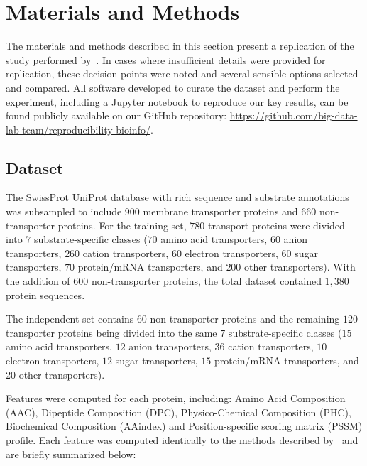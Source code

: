 \section{Materials and Methods}
\label{sec:materials}
The materials and methods described in this section present a replication of the study performed
by~\cite{mishra2014prediction}. In cases where insufficient details were provided for replication,
these decision points were noted and several sensible options selected and compared. All software 
developed to curate the dataset and perform the experiment, including a Jupyter notebook to reproduce our key results, can be found publicly available on
our GitHub repository: \url{https://github.com/big-data-lab-team/reproducibility-bioinfo/}.

\subsection{Dataset}
\label{sec:dataset}

The SwissProt UniProt database with rich sequence and substrate
annotations~\cite{boeckmann2003swiss} was subsampled to include $900$ membrane transporter proteins and $660$
non-transporter proteins. For the training set, $780$ transport proteins were divided into $7$ substrate-specific 
classes ($70$ amino acid transporters, $60$ anion transporters, $260$ cation transporters, $60$ electron transporters, $60$ 
sugar transporters, $70$ protein/mRNA transporters, and $200$ other transporters). With the addition of 600 non-transporter
proteins, the total dataset contained $1,380$ protein sequences. 

The independent set contains $60$ non-transporter proteins
and the remaining $120$ transporter proteins being divided into the same $7$ substrate-specific classes 
($15$ amino acid transporters, $12$ anion transporters, $36$ cation transporters, $10$ electron transporters, 
$12$ sugar transporters, $15$ protein/mRNA transporters, and $20$ other transporters).
 

Features were computed for each protein, including: Amino Acid Composition (AAC), Dipeptide Composition (DPC),
Physico-Chemical Composition (PHC), Biochemical Composition (AAindex) and Position-specific scoring matrix (PSSM)
profile. Each feature was computed identically to the methods described by~\cite{mishra2014prediction} and are briefly
summarized below:

